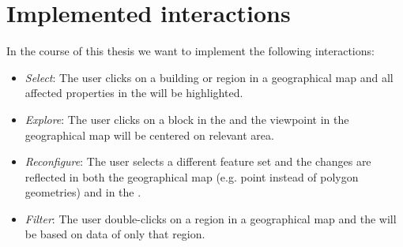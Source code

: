 \section{Implemented interactions}

In the course of this thesis we want to implement the following interactions:
\begin{itemize}
  \item
    \emph{Select}: The user clicks on a building or region in a geographical map and all affected properties in the \tmap{} will be highlighted.
  \item
    \emph{Explore}: The user clicks on a block in the \tmap{} and the viewpoint in the geographical map will be centered on relevant area.
  \item
    \emph{Reconfigure}: The user selects a different feature set and the changes are reflected in both the geographical map (e.g. point instead of polygon geometries) and in the \tmap{}.
  \item
    \emph{Filter}: The user double-clicks on a region in a geographical map and the \tmap{} will be based on data of only that region.
\end{itemize}
